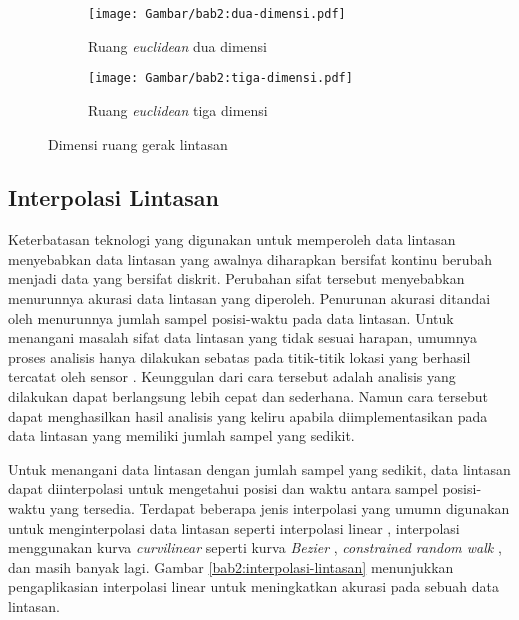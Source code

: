 \iffalse

Pada skripsi ini, entitas yang diamati akan bergerak dalam ruang \textit{euclidean} dua dimensi yang disimbolkan sebagai $\mathbb{R}^2$\lionov{ini harusnya ada di batasan}.

\fi

\begin{figure}[b!]
    \centering
    \begin{subfigure}[h]{0.35\textwidth}
        \centering
        \texttt{[image: Gambar/bab2:dua-dimensi.pdf]}
        \caption{Ruang \textit{euclidean} dua dimensi}
        \label{bab2:dua-dimensi}
    \end{subfigure} \hspace{2cm}
    \begin{subfigure}[h]{0.35\textwidth}
        \centering
        \texttt{[image: Gambar/bab2:tiga-dimensi.pdf]}
        \caption{Ruang \textit{euclidean} tiga dimensi}
        \label{bab2:tiga-dimensi}
    \end{subfigure}
    \caption{Dimensi ruang gerak lintasan}
    \label{bab2:ruang-gerak}
\end{figure}

\subsection{Interpolasi Lintasan}
\label{subsec:interpolasi}

Keterbatasan teknologi yang digunakan untuk memperoleh data lintasan menyebabkan data lintasan yang awalnya diharapkan bersifat kontinu berubah menjadi data yang bersifat diskrit. Perubahan sifat tersebut menyebabkan menurunnya akurasi data lintasan yang diperoleh. Penurunan akurasi ditandai oleh menurunnya jumlah sampel posisi-waktu pada data lintasan. Untuk menangani masalah sifat data lintasan yang tidak sesuai harapan, umumnya proses analisis hanya dilakukan sebatas pada titik-titik lokasi yang berhasil tercatat oleh sensor \cite{wiratma:trajectory}. Keunggulan dari cara tersebut adalah analisis yang dilakukan dapat berlangsung lebih cepat dan sederhana. Namun cara tersebut dapat menghasilkan hasil analisis yang keliru apabila diimplementasikan pada data lintasan yang memiliki jumlah sampel yang sedikit.

Untuk menangani data lintasan dengan jumlah sampel yang sedikit, data lintasan dapat diinterpolasi untuk mengetahui posisi dan waktu antara sampel posisi-waktu yang tersedia. Terdapat beberapa jenis interpolasi yang umumn digunakan untuk menginterpolasi data lintasan seperti interpolasi linear \cite{wiratma:trajectory}, interpolasi menggunakan kurva \textit{curvilinear} seperti kurva \textit{Bezier} \cite{tremblay:02:curvilinear}, \textit{constrained random walk} \cite{wentz:02:constrained-random-walk}, dan masih banyak lagi. Gambar \ref{bab2:interpolasi-lintasan} menunjukkan pengaplikasian interpolasi linear untuk meningkatkan akurasi pada sebuah data lintasan.

